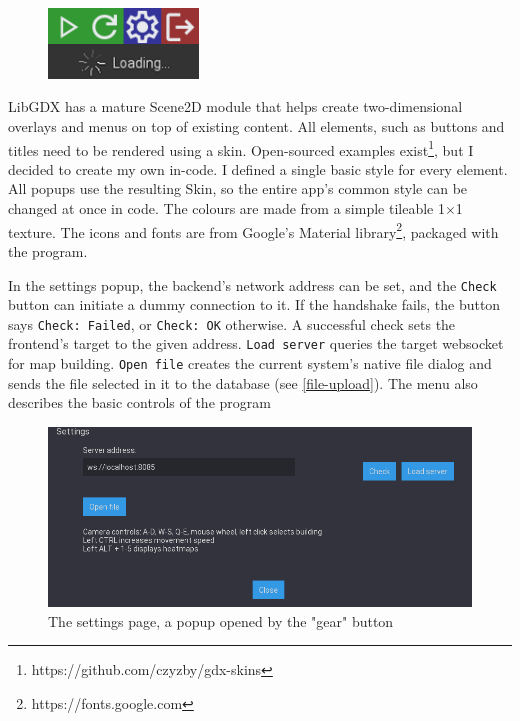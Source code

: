 \begin{figure}[!h]
    \centering
    \includegraphics[width=40mm, keepaspectratio]{images/menu-buttons.png}
    \caption{}
\end{figure}

LibGDX has a mature Scene2D module that helps create two-dimensional overlays and menus on top of existing content. All elements, such as buttons and titles need to be rendered using a skin. Open-sourced examples exist\footnote{https://github.com/czyzby/gdx-skins}, but I decided to create my own in-code. I defined a single basic style for every element. All popups use the resulting Skin, so the entire app's common style can be changed at once in code. The colours are made from a simple tileable 1$\times$1 texture. The icons and fonts are from Google's Material library\footnote{https://fonts.google.com}, packaged with the program.

In the settings popup, the backend's network address can be set, and the \verb|Check| button can initiate a dummy connection to it. If the handshake fails, the button says \verb|Check: Failed|, or \verb|Check: OK| otherwise. A successful check sets the frontend's target to the given address. \verb|Load server| queries the target websocket for map building. \verb|Open file| creates the current system's native file dialog and sends the file selected in it to the database (see \ref{file-upload}). The menu also describes the basic controls of the program

\begin{figure}[!ht]
    \centering
    \includegraphics[width=150mm, keepaspectratio]{images/settings.png}
    \caption{The settings page, a popup opened by the "gear" button}
\end{figure}

